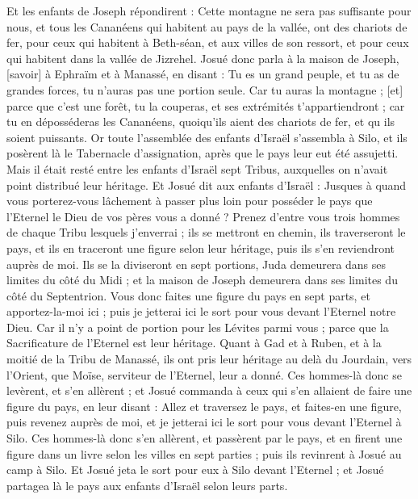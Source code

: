 \begin{multicols}{2}
Et les enfants de Joseph répondirent : Cette montagne ne sera pas suffisante pour nous, et tous les Cananéens qui habitent au pays de la vallée, ont des chariots de fer, pour ceux qui habitent à Beth-séan, et aux villes de son ressort, et pour ceux qui habitent dans la vallée de Jizrehel.
Josué donc parla à la maison de Joseph, [savoir] à Ephraïm et à Manassé, en disant : Tu es un grand peuple, et tu as de grandes forces, tu n'auras pas une portion seule.
Car tu auras la montagne ; [et] parce que c'est une forêt, tu la couperas, et ses extrémités t'appartiendront ; car tu en déposséderas les Cananéens, quoiqu'ils aient des chariots de fer, et qu ils soient puissants.
\VerseOne{}Or toute l'assemblée des enfants d'Israël s'assembla à Silo, et ils posèrent là le Tabernacle d'assignation, après que le pays leur eut été assujetti.
Mais il était resté entre les enfants d'Israël sept Tribus, auxquelles on n'avait point distribué leur héritage.
Et Josué dit aux enfants d'Israël : Jusques à quand vous porterez-vous lâchement à passer plus loin pour posséder le pays que l'Eternel le Dieu de vos pères vous a donné ?
Prenez d'entre vous trois hommes de chaque Tribu lesquels j'enverrai ; ils se mettront en chemin, ils traverseront le pays, et ils en traceront une figure selon leur héritage, puis ils s'en reviendront auprès de moi.
Ils se la diviseront en sept portions, Juda demeurera dans ses limites du côté du Midi ; et la maison de Joseph demeurera dans ses limites du côté du Septentrion.
Vous donc faites une figure du pays en sept parts, et apportez-la-moi ici ; puis je jetterai ici le sort pour vous devant l'Eternel notre Dieu.
Car il n'y a point de portion pour les Lévites parmi vous ; parce que la Sacrificature de l'Eternel est leur héritage. Quant à Gad et à Ruben, et à la moitié de la Tribu de Manassé, ils ont pris leur héritage au delà du Jourdain, vers l'Orient, que Moïse, serviteur de l'Eternel, leur a donné.
Ces hommes-là donc se levèrent, et s'en allèrent ; et Josué commanda à ceux qui s'en allaient de faire une figure du pays, en leur disant : Allez et traversez le pays, et faites-en une figure, puis revenez auprès de moi, et je jetterai ici le sort pour vous devant l'Eternel à Silo.
Ces hommes-là donc s'en allèrent, et passèrent par le pays, et en firent une figure dans un livre selon les villes en sept parties ; puis ils revinrent à Josué au camp à Silo.
Et Josué jeta le sort pour eux à Silo devant l'Eternel ; et Josué partagea là le pays aux enfants d'Israël selon leurs parts.

\end{multicols}
